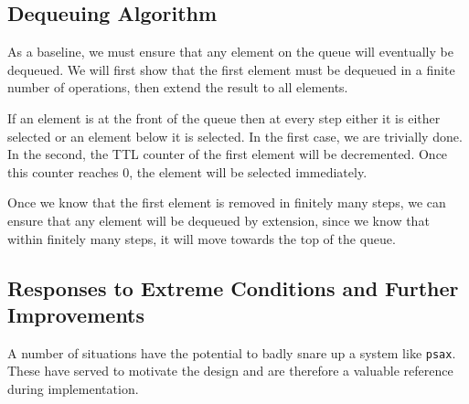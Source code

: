 \documentclass[a4paper]{report}
\newcommand{\inlinecode}{\texttt}
\begin{document}
\subsection{Dequeuing Algorithm}

As a baseline, we must ensure that any element on the queue will eventually be dequeued. We will first show that the first element must be dequeued in a finite number of operations, then extend the result to all elements.

If an element is at the front of the queue then at every step either it is either selected or an element below it is selected. In the first case, we are trivially done. In the second, the TTL counter of the first element will be decremented. Once this counter reaches $0$, the element will be selected immediately.

Once we know that the first element is removed in finitely many steps, we can ensure that any element will be dequeued by extension, since we know that within finitely many steps, it will move towards the top of the queue.

\subsection{Responses to Extreme Conditions and Further Improvements}

A number of situations have the potential to badly snare up a system like \inlinecode{psax}. These have served to motivate the design and are therefore a valuable reference during implementation.
\end{document}
